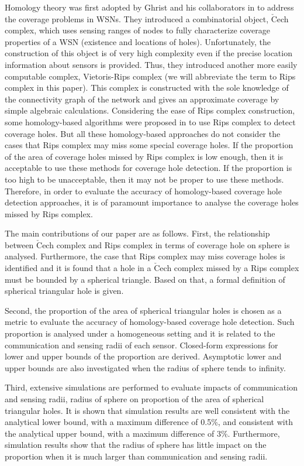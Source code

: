 \documentclass[journal, twoside]{IEEEtran}
\begin{document}
Homology theory was first adopted by Ghrist and his collaborators in \cite{DSG05, DSG07, GM05}
to address the coverage problems in WSNs. They introduced a combinatorial object,
$\check{\textrm{C}}$ech complex, which uses sensing ranges of nodes to fully characterize coverage properties of a WSN (existence and locations of holes).
Unfortunately, the construction of this object is of very high 
complexity \cite{CO08} even if
the precise location information about sensors is provided. 
Thus, they introduced another more easily computable complex,
Vietoris-Rips complex (we will abbreviate the term to Rips complex in this paper). 
This complex is constructed with the sole
knowledge of the connectivity graph of the network and gives an
approximate coverage by simple algebraic calculations. 
Considering the ease of Rips complex construction, some homology-based 
algorithms were proposed in \cite{ME06, MJ07, TJ10} 
to use Rips complex to detect coverage holes. But all these homology-based
approaches do not consider the cases that
Rips complex may miss some special coverage holes. If the proportion
of the area of coverage holes missed by Rips complex is low enough,
then it is acceptable to use these methods for coverage hole detection.
If the proportion is too high to be unacceptable, then it may not be proper
to use these methods. Therefore, in order to evaluate the accuracy of homology-based 
coverage hole detection approaches, it is of paramount importance to 
analyse the coverage holes missed by Rips complex.

The main contributions of our paper are as follows. First, the relationship between
$\check{\textrm{C}}$ech complex and Rips complex in terms of coverage
hole on sphere is analysed. Furthermore, the case that Rips complex
may miss coverage holes is identified and it is found that a hole in
a $\check{\textrm{C}}$ech complex missed by a Rips complex must be 
bounded by a spherical triangle. Based on that, a formal definition
of spherical triangular hole is given.

Second, the proportion of the area of spherical triangular holes is chosen
as a metric to evaluate the accuracy of homology-based coverage hole 
detection. Such proportion is analysed under a homogeneous setting and it
is related to the communication and sensing radii of each sensor. 
Closed-form expressions for lower and upper bounds of the proportion 
are derived. Asymptotic lower and upper bounds are also investigated
when the radius of sphere tends to infinity.

Third, extensive simulations are performed to evaluate impacts of
communication and sensing radii, radius of sphere on proportion
of the area of spherical triangular holes. It is shown that simulation 
results are well consistent with the analytical lower bound, with a maximum 
difference of 0.5\%, and consistent with the analytical upper bound, with
a maximum difference of 3\%. Furthermore, simulation results
show that the radius of sphere has little impact on the proportion when
it is much larger than communication and sensing radii.   
\end{document}
